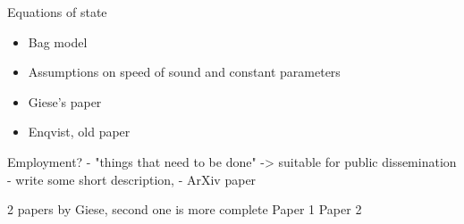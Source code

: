 Equations of state
\begin{itemize}
    \item Bag model \cite[eq. 7.33]{lecture_notes}
    \item Assumptions on speed of sound and constant parameters
    \item Giese's paper \cite{giese_model-independent_2020}
    \item Enqvist, old paper \cite{enqvist_nucleation_1992}
\end{itemize}

Employment?
- "things that need to be done"
-> suitable for public dissemination
- write some short description,
    - ArXiv paper

2 papers by Giese, second one is more complete
Paper 1 \cite{giese_2020}
Paper 2 \cite{giese_2021}

